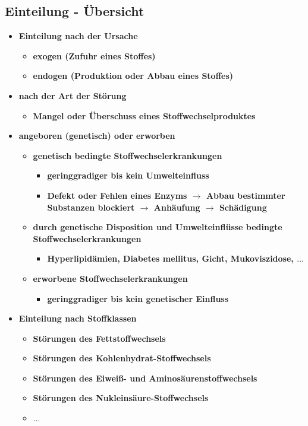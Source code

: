 \subsection{Einteilung - Übersicht}
	\begin{itemize}
		\item \textbf{Einteilung nach der Ursache}
			\begin{itemize}
				\item \textbf{exogen (Zufuhr eines Stoffes)}
				\item \textbf{endogen (Produktion oder Abbau eines Stoffes)}
			\end{itemize}
		\item \textbf{nach der Art der Störung}
			\begin{itemize}
				\item \textbf{Mangel oder Überschuss eines Stoffwechselproduktes}
			\end{itemize}
		\item \textbf{angeboren (genetisch) oder erworben}
			\begin{itemize}
				\item \textbf{genetisch bedingte Stoffwechselerkrankungen}
					\begin{itemize}
						\item \textbf{geringgradiger bis kein Umwelteinfluss}
						\item \textbf{Defekt oder Fehlen eines Enzyms $\rightarrow$ Abbau bestimmter Substanzen blockiert $\rightarrow$ Anhäufung $\rightarrow$ Schädigung}
					\end{itemize}
			\end{itemize}		
			\begin{itemize}
				\item \textbf{durch genetische Disposition und Umwelteinflüsse bedingte Stoffwechselerkrankungen}
					\begin{itemize}
						\item \textbf{Hyperlipidämien, Diabetes mellitus, Gicht, Mukoviszidose, $\dots$}
					\end{itemize}
				\item \textbf{erworbene Stoffwechselerkrankungen}
					\begin{itemize}
						\item \textbf{geringgradiger bis kein genetischer Einfluss}
					\end{itemize}
			\end{itemize}
		\item \textbf{Einteilung nach Stoffklassen}
			\begin{itemize}
				\item \textbf{Störungen des Fettstoffwechsels}
				\item \textbf{Störungen des Kohlenhydrat-Stoffwechsels}
				\item \textbf{Störungen des Eiweiß- und Aminosäurenstoffwechsels}
				\item \textbf{Störungen des Nukleinsäure-Stoffwechsels}
				\item \textbf{$\dots$}
			\end{itemize}
	\end{itemize}
